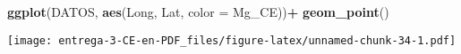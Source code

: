 \documentclass[
]{article}
\newenvironment{Shaded}{\begin{snugshade}}{\end{snugshade}}
\newcommand{\DataTypeTok}[1]{\textcolor[rgb]{0.13,0.29,0.53}{#1}}
\newcommand{\DecValTok}[1]{\textcolor[rgb]{0.00,0.00,0.81}{#1}}
\newcommand{\KeywordTok}[1]{\textcolor[rgb]{0.13,0.29,0.53}{\textbf{#1}}}
\newcommand{\NormalTok}[1]{#1}
\newcommand{\OperatorTok}[1]{\textcolor[rgb]{0.81,0.36,0.00}{\textbf{#1}}}
\newcommand{\StringTok}[1]{\textcolor[rgb]{0.31,0.60,0.02}{#1}}
\begin{document}
\begin{Shaded}
\begin{Highlighting}[]
\KeywordTok{ggplot}\NormalTok{(DATOS, }\KeywordTok{aes}\NormalTok{(Long, Lat, }\DataTypeTok{color =}\NormalTok{ Mg_CE))}\OperatorTok{+}
\StringTok{  }\KeywordTok{geom_point}\NormalTok{()}
\end{Highlighting}
\end{Shaded}

\texttt{[image: entrega-3-CE-en-PDF\_files/figure-latex/unnamed-chunk-34-1.pdf]}

\begin{Shaded}
\end{Shaded}
\end{document}
